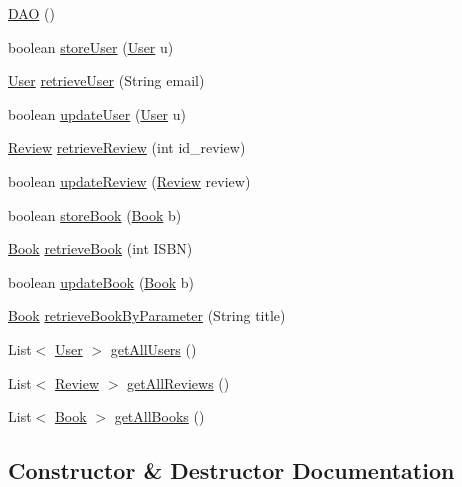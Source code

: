 \begin{DoxyCompactItemize}
\item 
\hyperlink{classdb_1_1_d_a_o_abd016ae9834e8d5e94d96f551d1636e7}{D\+AO} ()
\item 
boolean \hyperlink{classdb_1_1_d_a_o_a1600c5d7d28eb225fc7c244fdfb16150}{store\+User} (\hyperlink{classserver_1_1data_1_1_user}{User} u)
\item 
\hyperlink{classserver_1_1data_1_1_user}{User} \hyperlink{classdb_1_1_d_a_o_a6da084ffd9b0da23acba9dc68e747303}{retrieve\+User} (String email)
\item 
boolean \hyperlink{classdb_1_1_d_a_o_a5cd4462deb77065c2d12471cd73b3ec8}{update\+User} (\hyperlink{classserver_1_1data_1_1_user}{User} u)
\item 
\hyperlink{classserver_1_1data_1_1_review}{Review} \hyperlink{classdb_1_1_d_a_o_ae43e182fae8ee7028db6ff17c2d5768f}{retrieve\+Review} (int id\+\_\+review)
\item 
boolean \hyperlink{classdb_1_1_d_a_o_ab73940ac7600902ea7d52bcd041a9c6e}{update\+Review} (\hyperlink{classserver_1_1data_1_1_review}{Review} review)
\item 
boolean \hyperlink{classdb_1_1_d_a_o_a036246b8124d7ac8a36e3eaafd3eb81a}{store\+Book} (\hyperlink{classserver_1_1data_1_1_book}{Book} b)
\item 
\hyperlink{classserver_1_1data_1_1_book}{Book} \hyperlink{classdb_1_1_d_a_o_ade778f907d0a74dc27c4fc03f8709815}{retrieve\+Book} (int I\+S\+BN)
\item 
boolean \hyperlink{classdb_1_1_d_a_o_a4ea10c177ef93a3084ed74b38556adca}{update\+Book} (\hyperlink{classserver_1_1data_1_1_book}{Book} b)
\item 
\hyperlink{classserver_1_1data_1_1_book}{Book} \hyperlink{classdb_1_1_d_a_o_a1f8580da682f8a8af4896c491c3b6611}{retrieve\+Book\+By\+Parameter} (String title)
\item 
List$<$ \hyperlink{classserver_1_1data_1_1_user}{User} $>$ \hyperlink{classdb_1_1_d_a_o_a3b627b7177990799fd02e0c38b8adb70}{get\+All\+Users} ()
\item 
List$<$ \hyperlink{classserver_1_1data_1_1_review}{Review} $>$ \hyperlink{classdb_1_1_d_a_o_a4df79c7d44b050aa55451db2ecf342f6}{get\+All\+Reviews} ()
\item 
List$<$ \hyperlink{classserver_1_1data_1_1_book}{Book} $>$ \hyperlink{classdb_1_1_d_a_o_a82a8c60ccd0de2f70b69bc36d29aeef8}{get\+All\+Books} ()
\end{DoxyCompactItemize}


\subsection{Constructor \& Destructor Documentation}
\mbox{\label{classdb_1_1_d_a_o_abd016ae9834e8d5e94d96f551d1636e7}} 
